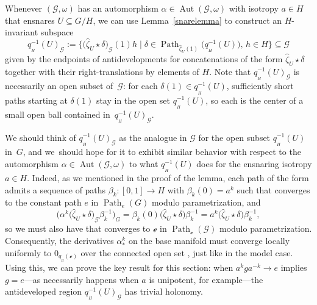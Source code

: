 \documentclass[10pt,a4paper]{amsart}
\numberwithin{equation}{section}
\theoremstyle{definition}
\DeclareMathOperator{\Aut}{\mathrm{Aut}}
\DeclareMathOperator{\Path}{Path}
\begin{document}
Whenever $(\mathscr{G},\omega)$ has an automorphism $\alpha\in\Aut(\mathscr{G},\omega)$ with isotropy $a\in H$ that ensnares $U\subseteq G/H$, we can use Lemma~\ref{snarelemma} to construct an $H$-invariant subspace \[q_{{}_H}^{-1}(U)_\mathscr{G}:=\bigl\{\bigl(\hat{\zeta}_U\star\delta\bigr)_\mathscr{G}(1)h\mid \delta\in\Path_{\hat{\zeta}_U(1)}\bigl(q_{{}_H}^{-1}(U)\bigr),\,h\in H\bigl\}\subseteq\mathscr{G}\] given by the endpoints of antidevelopments for concatenations of the form $\hat{\zeta}_U\star\delta$ together with their right-translations by elements of $H$. Note that $q_{{}_H}^{-1}(U)_\mathscr{G}$ is necessarily an open subset of~$\mathscr{G}$: for each $\delta(1)\in q_{{}_H}^{-1}(U)$, sufficiently short paths starting at $\delta(1)$ stay in the open set $q_{{}_H}^{-1}(U)$, so each  is the center of a small open ball contained in~$q_{{}_H}^{-1}(U)_\mathscr{G}$.

We should think of $q_{{}_H}^{-1}(U)_\mathscr{G}$ as the analogue in $\mathscr{G}$ for the open subset $q_{{}_H}^{-1}(U)$ in~$G$, and we~should hope for it to exhibit similar behavior with respect to the automorphism $\alpha\in\Aut(\mathscr{G},\omega)$ to what $q_{{}_H}^{-1}(U)$ does for the ensnaring isotropy $a\in H$. Indeed, as we mentioned in the proof of the lemma, each path of the form  admits a sequence of paths $\beta_k\colon [0,1]\to H$ with $\beta_k(0)=a^k$ such that  converges to the constant path $e$ in $\Path_e(G)$ modulo parametrization, and \[\bigl(\alpha^k\bigl(\hat{\zeta}_U\star\delta\bigr)_\mathscr{G}\beta_k^{-1}\bigr)_G =\beta_k(0)\bigl(\hat{\zeta}_U\star\delta\bigr)\beta_k^{-1} =a^k\bigl(\hat{\zeta}_U\star\delta\bigr)\beta_k^{-1},
\] so we must also have that  converges to $\mathscr{e}$ in $\Path_\mathscr{e}(\mathscr{G})$ modulo parametrization. Consequently, the derivatives $\alpha^k_*$ on the base manifold must converge locally uniformly to $0_{q_{{}_H}(\mathscr{e})}$ over the connected open set , just like in the model case. Using this, we can prove the key result for this section: when $a^kga^{-k}\rightarrow e$ implies $g=e$---as necessarily happens when $a$ is unipotent, for example---the antideveloped region $q_{{}_H}^{-1}(U)_\mathscr{G}$ has trivial holonomy.
\end{document}
